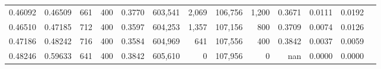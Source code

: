 \begin{tabular}{rrrrrrrrrrrrr}
0.46092 & 0.46509 &    661 & 400 &                                     0.3770 & 603,541 &   2,069 & 106,756 &   1,200 & 0.3671 & 0.0111 & 0.0192 \\
0.46510 & 0.47185 &    712 & 400 &                                     0.3597 & 604,253 &   1,357 & 107,156 &     800 & 0.3709 & 0.0074 & 0.0126 \\
0.47186 & 0.48242 &    716 & 400 &                                     0.3584 & 604,969 &     641 & 107,556 &     400 & 0.3842 & 0.0037 & 0.0059 \\
0.48246 & 0.59633 &    641 & 400 &                                     0.3842 & 605,610 &       0 & 107,956 &       0 &    nan & 0.0000 & 0.0000 \\
\bottomrule
\end{tabular}

